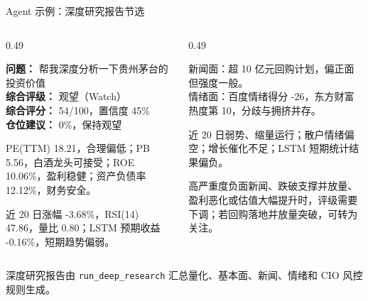 \documentclass[10pt,aspectratio=43]{beamer}
\newcommand{\code}[1]{\texttt{#1}}
\begin{document}
\begin{frame}{Agent 示例：深度研究报告节选}
  \scriptsize
  \begin{columns}[T]
    \begin{column}{0.49\textwidth}
      \begin{hlbox}[title=输入与综合结论]
        \textbf{问题：} 帮我深度分析一下贵州茅台的投资价值\\[0.25em]
        \textbf{综合评级：} 观望（Watch）\\
        \textbf{综合评分：} 54/100，置信度 45\%\\
        \textbf{仓位建议：} 0\%，保持观望
      \end{hlbox}
      \vspace{0.45em}
      \begin{greenbox}[title=基本面]
        PE(TTM) 18.21，合理偏低；PB 5.56，白酒龙头可接受；ROE 10.06\%，盈利稳健；资产负债率 12.12\%，财务安全。
      \end{greenbox}
      \vspace{0.45em}
      \begin{orangebox}[title=技术面与 LSTM]
        近 20 日涨幅 -3.68\%，RSI(14) 47.86，量比 0.80；LSTM 预期收益 -0.16\%，短期趋势偏弱。
      \end{orangebox}
    \end{column}
    \begin{column}{0.49\textwidth}
      \begin{hlbox}[title=新闻与情绪]
        新闻面：超 10 亿元回购计划，偏正面但强度一般。\\
        情绪面：百度情绪得分 -26，东方财富热度第 10，分歧与拥挤并存。
      \end{hlbox}
      \vspace{0.45em}
      \begin{greenbox}[title=风险提示]
        近 20 日弱势、缩量运行；散户情绪偏空；增长催化不足；LSTM 短期统计结果偏负。
      \end{greenbox}
      \vspace{0.45em}
      \begin{orangebox}[title=失效条件]
        高严重度负面新闻、跌破支撑并放量、盈利恶化或估值大幅提升时，评级需要下调；若回购落地并放量突破，可转为关注。
      \end{orangebox}
    \end{column}
  \end{columns}
  \vspace{0.45em}
  \centering
  \scriptsize\color{AccentGray}
  深度研究报告由 \code{run\_deep\_research} 汇总量化、基本面、新闻、情绪和 CIO 风控规则生成。
\end{frame}
\end{document}
